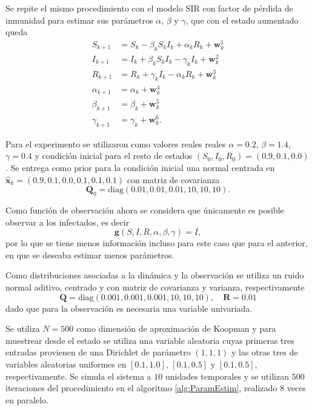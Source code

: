 Se repite el mismo procedimiento con el modelo SIR con factor de pérdida de inmunidad para estimar sus parámetros $\alpha$, $\beta$ y $\gamma$, que con el estado aumentado queda
\begin{equation*}
    \begin{aligned}
        S_{k+1} &= S_k - \beta_k S_k I_k + \alpha_k R_k + \mathbf{w}_k^1 \\
        I_{k+1} &= I_k + \beta_k S_k I_k - \gamma_k I_k + \mathbf{w}_k^2 \\
        R_{k+1} &= R_k + \gamma_k I_k - \alpha_k R_k + \mathbf{w}_k^3 \\
        \alpha_{k+1} &= \alpha_k + \mathbf{w}_k^4 \\
        \beta_{k+1} &= \beta_k + \mathbf{w}_k^5 \\
        \gamma_{k+1} &= \gamma_k + \mathbf{w}_k^6.
    \end{aligned}
\end{equation*}

Para el experimento se utilizaron como valores reales reales $\alpha = 0.2$, $\beta = 1.4$, $\gamma = 0.4$ y condición inicial para el resto de estados $(S_0, I_0, R_0) = (0.9, 0.1, 0.0)$. Se entrega como prior para la condición inicial una normal centrada en $\hat{\mathbf{x}}_k = (0.9, 0.1, 0.0, 0.1, 0.1, 0.1)$ con matriz de covarianza
\[
\mathbf{Q}_0 = \text{diag}(0.01, 0.01, 0.01, 10, 10, 10).
\]

Como función de observación ahora se considera que únicamente es posible observar a los infectados, es decir
\[
\mathbf{g}(S, I, R, \alpha, \beta, \gamma) = I,
\]
por lo que se tiene menos información incluso para este caso que para el anterior, en que se deseaba estimar menos parámetros.

Como distribuciones asociadas a la dinámica y la observación se utiliza un ruido normal aditivo, centrado y con matriz de covarianza y varianza, respectivamente
\[
\mathbf{Q} = \text{diag}(0.001, 0.001, 0.001, 10, 10, 10), \quad \mathbf{R} = 0.01
\]
dado que para la observación es necesaria una variable univariada.

Se utiliza $N=500$ como dimensión de aproximación de Koopman y para muestrear desde el estado se utiliza una variable aleatoria cuyas primeras tres entradas provienen de una Dirichlet de parámetro $(1,1,1)$ y las otras tres de variables aleatorias uniformes en $[0.1, 1.0]$, $[0.1, 0.5]$ y $[0.1, 0.5]$, respectivamente. Se simula el sistema a $10$ unidades temporales y se utilizan $500$ iteraciones del procedimiento en el algoritmo \ref{alg:ParamEstim}, realizado $8$ veces en paralelo.

